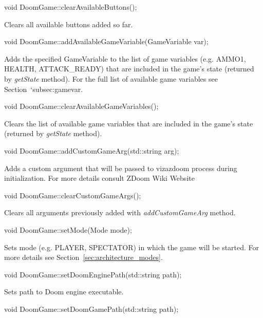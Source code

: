 \documentclass[english,bachelor,a4paper,twoside]{ppfcmthesis}
\begin{document}
\vspace{20pt}
\begin{clinee}
void DoomGame::clearAvailableButtons();
\end{clinee}
	Clears all available buttons added so far.


\vspace{20pt}
\begin{clinee}
void DoomGame::addAvailableGameVariable(GameVariable var);
\end{clinee}
	Adds the specified GameVariable to the list of game variables (e.g. AMMO1, HEALTH, ATTACK\_READY) that are included in the game's state (returned by \emph{getState} method). For the full list of available game variables see Section~`{subsec:gamevar}.


\vspace{20pt}
\begin{clinee}
void DoomGame::clearAvailableGameVariables();
\end{clinee}
	Clears the list of available game variables that are included in the game's state (returned by \emph{getState} method).


\vspace{20pt}
\begin{clinee}
void DoomGame::addCustomGameArg(std::string arg);
\end{clinee}
	Adds a custom argument that will be passed to vizazdoom process during initialization. For more details consult ZDoom Wiki Website\cite{zdoom-wiki}


\vspace{20pt}
\begin{clinee}
void DoomGame::clearCustomGameArgs();
\end{clinee}
	Clears all arguments previously added with \emph{addCustomGameArg} method.


\vspace{20pt}
\begin{clinee}
void DoomGame::setMode(Mode mode);
\end{clinee}
	Sets mode (e.g. PLAYER, SPECTATOR) in which the game will be started. For more details see Section~\ref{sec:architecture_modes}.


\vspace{20pt}
\begin{clinee}
void DoomGame::setDoomEnginePath(std::string path);
\end{clinee}

Sets path to Doom engine executable.


\vspace{20pt}
\begin{clinee}
void DoomGame::setDoomGamePath(std::string path);
\end{clinee}
\end{document}

